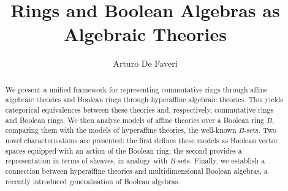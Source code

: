 \documentclass{amsart}
\numberwithin{equation}{section}
\theoremstyle{plain}
\theoremstyle{definition}
\begin{document}
%
\title{Rings and Boolean Algebras as Algebraic Theories}

%
\author{Arturo De Faveri} %
%
%
\address{IRIF\\
CNRS and Universit\'e Paris Cit\'e\\
8 Place Aur\'elie Nemours, 75013 Paris, France
}

\begin{abstract}
We present a unified framework for representing commutative rings through affine algebraic theories and 
Boolean rings through hyperaffine algebraic theories.
This yields categorical equivalences between these theories and, respectively, commutative rings and Boolean rings. 
We then analyse models of affine theories over a Boolean ring $B$, comparing them with the models of hyperaffine theories, the well-known $B$-sets. 
Two novel characterisations are presented: the first defines these models as Boolean vector spaces equipped with an action of the Boolean ring; 
the second provides a representation in terms of sheaves, in analogy with $B$-sets.
Finally, we establish a connection between hyperaffine theories and multidimensional Boolean algebras, a recently introduced generalisation of Boolean algebras.   

\end{abstract}

\maketitle
\end{document}
